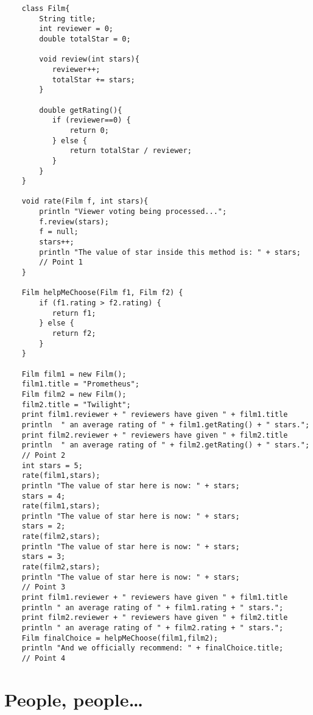 \documentclass{article}
\begin{document}
\begin{verbatim}
    class Film{
        String title;
        int reviewer = 0;
        double totalStar = 0;     
      
        void review(int stars){
           reviewer++;
           totalStar += stars;
        }
      
        double getRating(){
           if (reviewer==0) {
               return 0;
           } else {
               return totalStar / reviewer;
           }
        }
    }
    
    void rate(Film f, int stars){
        println "Viewer voting being processed...";
        f.review(stars);
        f = null;
        stars++;
        println "The value of star inside this method is: " + stars;
        // Point 1
    }
    
    Film helpMeChoose(Film f1, Film f2) {
        if (f1.rating > f2.rating) {
           return f1;
        } else {
           return f2;
        }
    }
    
    Film film1 = new Film();
    film1.title = "Prometheus";
    Film film2 = new Film();
    film2.title = "Twilight";
    print film1.reviewer + " reviewers have given " + film1.title
    println  " an average rating of " + film1.getRating() + " stars.";
    print film2.reviewer + " reviewers have given " + film2.title
    println  " an average rating of " + film2.getRating() + " stars.";
    // Point 2
    int stars = 5;
    rate(film1,stars);
    println "The value of star here is now: " + stars;
    stars = 4;
    rate(film1,stars);
    println "The value of star here is now: " + stars;
    stars = 2;
    rate(film2,stars);
    println "The value of star here is now: " + stars;
    stars = 3;
    rate(film2,stars);
    println "The value of star here is now: " + stars;
    // Point 3
    print film1.reviewer + " reviewers have given " + film1.title
    println " an average rating of " + film1.rating + " stars.";
    print film2.reviewer + " reviewers have given " + film2.title
    println " an average rating of " + film2.rating + " stars.";
    Film finalChoice = helpMeChoose(film1,film2);
    println "And we officially recommend: " + finalChoice.title;
    // Point 4
\end{verbatim}


\section{People, people\ldots}
\label{sec:people-peopleldots}
\end{document}
